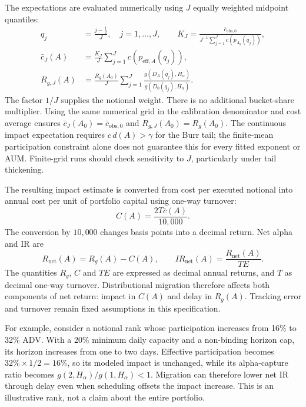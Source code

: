 \documentclass[11pt,a4paper]{article}
\numberwithin{equation}{section}
\begin{document}
The expectations are evaluated numerically using $J$ equally weighted midpoint quantiles:
\begin{equation}\label{eq:quadrature}
 \begin{aligned}
 q_j&=\frac{j-\tfrac12}{J},\quad j=1,\ldots,J,\qquad
 K_J=\frac{\bar c_{\mathrm{obs},0}}
 {J^{-1}\sum_{j=1}^{J}c(p_{A_0}(q_j))},\\
 \bar c_J(A)&=\frac{K_J}{J}\sum_{j=1}^{J}c(p_{\mathrm{eff},A}(q_j)),\\
 R_{g,J}(A)&=\frac{R_g(A_0)}{J}\sum_{j=1}^{J}
 \frac{g(D_A(q_j),H_\alpha)}{g(D_0(q_j),H_\alpha)}.
 \end{aligned}
\end{equation}
The factor $1/J$ supplies the notional weight. There is no additional bucket-share multiplier.
Using the same numerical grid in the calibration denominator and cost average ensures
$\bar c_J(A_0)=\bar c_{\mathrm{obs},0}$ and $R_{g,J}(A_0)=R_g(A_0)$.
The continuous impact expectation requires $c\,d(A)>\gamma$ for the Burr tail; the finite-mean
participation constraint alone does not guarantee this for every fitted exponent or AUM.
Finite-grid runs should check sensitivity to $J$, particularly under tail thickening.

The resulting impact estimate is converted from cost per executed notional into annual
cost per unit of portfolio capital using one-way turnover:
\begin{equation}\label{eq:drag}
 C(A)=\frac{2T\bar c(A)}{10{,}000}.
\end{equation}
The conversion by $10{,}000$ changes basis points into a decimal return. Net alpha and IR are
\begin{equation}\label{eq:net}
 R_{\mathrm{net}}(A)=R_g(A)-C(A),\qquad
 IR_{\mathrm{net}}(A)=\frac{R_{\mathrm{net}}(A)}{TE}.
\end{equation}
The quantities $R_g$, $C$ and $TE$ are expressed as decimal annual returns, and $T$ as
decimal one-way turnover. Distributional migration therefore affects both components of
net return: impact in $C(A)$ and delay in $R_g(A)$. Tracking error and turnover remain fixed assumptions
in this specification.

For example, consider a notional rank whose participation increases from 16\% to 32\% ADV. With a 20\% minimum
daily capacity and a non-binding horizon cap, its horizon increases from one to two days.
Effective participation becomes $32\%\times1/2=16\%$, so its modeled impact is unchanged,
while its alpha-capture ratio becomes $g(2,H_\alpha)/g(1,H_\alpha)<1$.
Migration can therefore lower net IR through delay even when scheduling offsets the impact
increase. This is an illustrative rank, not a claim about the entire portfolio.
\end{document}

